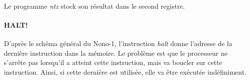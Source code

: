 \paragraph{}{
	Le programme \textit{ntz} stock son résultat dans le second registre.
}

\paragraph{HALT!}{
	D'après le schéma général du Nono-1, l'instruction \textit{halt} donne l'adresse
	de la dernière instruction dans la mémoire. Le problème est que le processeur ne 
	s’arrête pas lorsqu'il a atteint cette instruction, mais va boucler sur cette 
	instruction. Ainsi, si cette dernière est utilisée, elle va être exécutée indéfiniment. 
}